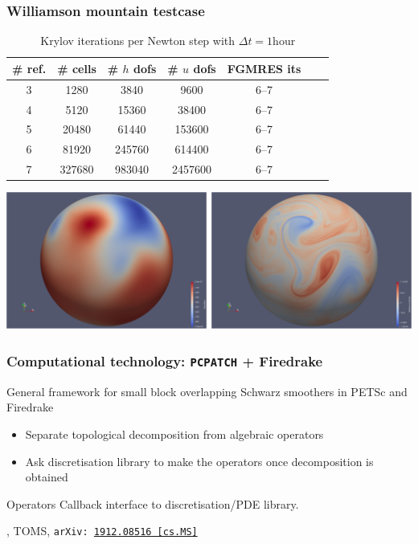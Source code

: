 \documentclass[presentation,aspectratio=43, 10pt]{beamer}
\newcommand{\arxivlink}[2]{{\texttt{arXiv:\,\href{https://arxiv.org/abs/#1}{#1\,[#2]}}}}
\begin{document}
\begin{frame}
  \frametitle{Williamson mountain testcase}
  \begin{table}[htbp]
    \centering
    \begin{tabular}{cc|ccccc}
      \toprule
      \# ref. & \# cells & \# $h$ dofs & \# $u$ dofs & FGMRES its\\
      \midrule
      3   & 1280 & 3840 & 9600 & 6--7\\
      4 & 5120  & 15360 & 38400 & 6--7\\
      5 & 20480 & 61440 & 153600 & 6--7\\
      6 & 81920 & 245760 & 614400 & 6--7\\
      7 & 327680 & 983040 & 2457600 & 6--7\\
      \bottomrule
    \end{tabular}
    \caption{Krylov iterations per Newton step with
      $\Delta t = 1\text{hour}$}
  \end{table}

  {\centering
    \includegraphics[height=0.4\textheight]{williamson-mountain-al}\par
    }
\end{frame}

\begin{frame}
  \frametitle{Computational technology: \texttt{PCPATCH} + Firedrake}
  General framework for small block overlapping Schwarz smoothers in
  PETSc and Firedrake

  \begin{itemize}
  \item Separate topological decomposition from algebraic operators
  \item Ask discretisation library to make the operators once
    decomposition is obtained
  \end{itemize}
  \begin{block}{Operators}
    Callback interface to discretisation/PDE library.
  \end{block}

  {\raggedleft
    \scriptsize \textcite{Farrell:2021b}, TOMS, \arxivlink{1912.08516}{cs.MS}\par}
\end{frame}
\end{document}
